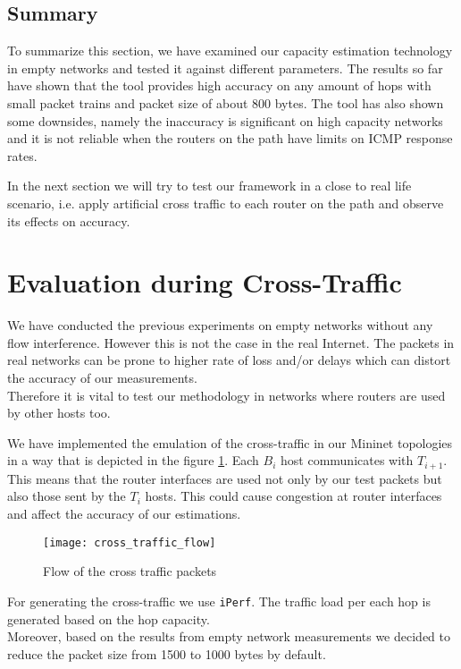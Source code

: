 \subsection{Summary}
To summarize this section, we have examined our capacity estimation technology in empty networks and tested it against different parameters. 
The results so far have shown that the tool provides high accuracy on any amount of hops with small packet trains and packet size of about 800 bytes. 
The tool has also shown some downsides, namely the inaccuracy is significant on high capacity networks and it is not reliable when the routers on the path have limits on ICMP response rates.

In the next section we will try to test our framework in a close to real life scenario, i.e. apply artificial cross traffic to each router on the path and observe its effects on accuracy.


\section{Evaluation during Cross-Traffic}
\label{section_ct}
We have conducted the previous experiments on empty networks without any flow interference. However this is not the case in the real Internet. The packets in real networks can be prone to higher rate of loss and/or delays which can distort the accuracy of our measurements.\\
Therefore it is vital to test our methodology in networks where routers are used by other hosts too. 

We have implemented the emulation of the cross-traffic in our Mininet topologies in a way that is depicted in the figure \ref{ct_flow}. Each $B_{i}$ host communicates with $T_{i+1}$. 
This means that the router interfaces are used not only by our test packets but also those sent by the $T_{i}$ hosts. This could cause congestion at router interfaces and affect the accuracy of our estimations. 


\begin{figure}[h]
 \centering
	 \texttt{[image: cross\_traffic\_flow]}
 \caption{Flow of the cross traffic packets}
 \label{ct_flow}
\end{figure}

For generating the cross-traffic we use \texttt{iPerf}\cite{iperf}. The traffic load per each hop is generated based on the hop capacity. \\
Moreover, based on the results from empty network measurements we decided to reduce the packet size from 1500 to 1000 bytes by default.

